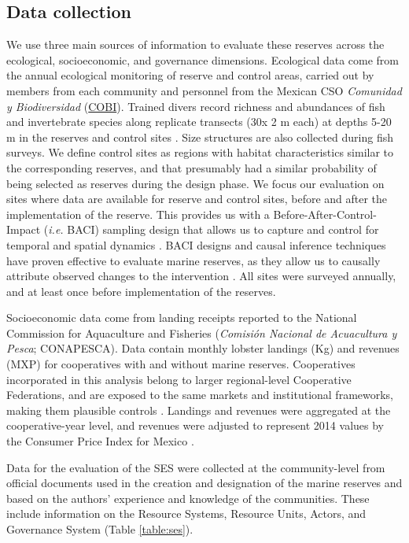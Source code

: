 \documentclass{frontiersSCNS}
\theoremstyle{definition}
\theoremstyle{definition}
\theoremstyle{definition}
\theoremstyle{remark}
\begin{document}
\subsection{Data collection}\label{data-collection}

We use three main sources of information to evaluate these reserves
across the ecological, socioeconomic, and governance dimensions.
Ecological data come from the annual ecological monitoring of reserve
and control areas, carried out by members from each community and
personnel from the Mexican CSO \emph{Comunidad y Biodiversidad}
(\href{www.cobi.org.mx}{COBI}). Trained divers record richness and
abundances of fish and invertebrate species along replicate transects
(30x 2 m each) at depths 5-20 m in the reserves and control sites
\citep{fulton_2018,fulton_2019}. Size structures are also collected
during fish surveys. We define control sites as regions with habitat
characteristics similar to the corresponding reserves, and that
presumably had a similar probability of being selected as reserves
during the design phase. We focus our evaluation on sites where data are
available for reserve and control sites, before and after the
implementation of the reserve. This provides us with a
Before-After-Control-Impact (\emph{i.e.} BACI) sampling design that
allows us to capture and control for temporal and spatial dynamics
\citep{depalma_2018,ferraro_2006-oW}. BACI designs and causal inference
techniques have proven effective to evaluate marine reserves, as they
allow us to causally attribute observed changes to the intervention
\citep{moland_2013-VP,Villasenor-Derbez_2018}. All sites were surveyed
annually, and at least once before implementation of the reserves.

Socioeconomic data come from landing receipts reported to the National
Commission for Aquaculture and Fisheries (\emph{Comisión Nacional de
Acuacultura y Pesca}; CONAPESCA). Data contain monthly lobster landings
(Kg) and revenues (MXP) for cooperatives with and without marine
reserves. Cooperatives incorporated in this analysis belong to larger
regional-level Cooperative Federations, and are exposed to the same
markets and institutional frameworks, making them plausible controls
\citep{mccay_2017-1m,ayer_2018}. Landings and revenues were aggregated
at the cooperative-year level, and revenues were adjusted to represent
2014 values by the Consumer Price Index for Mexico \citep{oecd_2017-VV}.

Data for the evaluation of the SES were collected at the community-level
from official documents used in the creation and designation of the
marine reserves
\citep{dof_website_2012,dof_website_2013,dof_website_2018} and based on
the authors' experience and knowledge of the communities. These include
information on the Resource Systems, Resource Units, Actors, and
Governance System (Table \ref{table:ses}).
\end{document}
